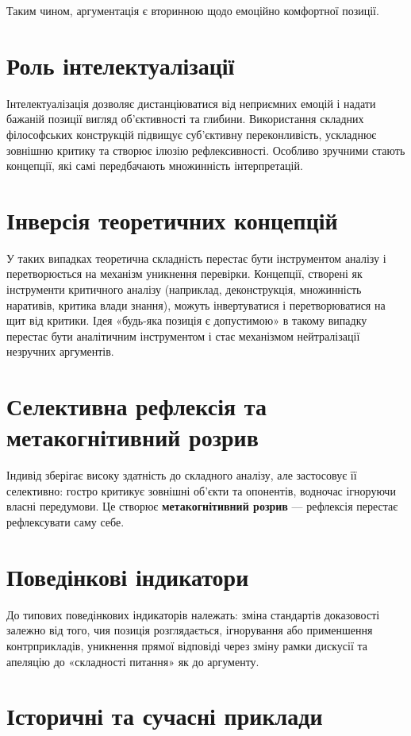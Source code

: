 \documentclass[12pt,a4paper]{article}
\begin{document}
Таким чином, аргументація є вторинною щодо емоційно комфортної позиції.

\section{Роль інтелектуалізації}
Інтелектуалізація дозволяє дистанціюватися від неприємних емоцій і надати бажаній позиції вигляд об’єктивності та глибини. Використання складних філософських конструкцій підвищує суб’єктивну переконливість, ускладнює зовнішню критику та створює ілюзію рефлексивності. Особливо зручними стають концепції, які самі передбачають множинність інтерпретацій.

\section{Інверсія теоретичних концепцій}
У таких випадках теоретична складність перестає бути інструментом аналізу і перетворюється на механізм уникнення перевірки.
Концепції, створені як інструменти критичного аналізу (наприклад, деконструкція, множинність наративів, критика влади знання), можуть інвертуватися і перетворюватися на щит від критики. Ідея «будь-яка позиція є допустимою» в такому випадку перестає бути аналітичним інструментом і стає механізмом нейтралізації незручних аргументів.

\section{Селективна рефлексія та метакогнітивний розрив}
Індивід зберігає високу здатність до складного аналізу, але застосовує її селективно: гостро критикує зовнішні об’єкти та опонентів, водночас ігноруючи власні передумови. Це створює \textbf{метакогнітивний розрив} — рефлексія перестає рефлексувати саму себе.

\section{Поведінкові індикатори}
До типових поведінкових індикаторів належать: зміна стандартів доказовості залежно від того, чия позиція розглядається, ігнорування або применшення контрприкладів, уникнення прямої відповіді через зміну рамки дискусії та апеляцію до «складності питання» як до аргументу.

\section{Історичні та сучасні приклади}
\end{document}
